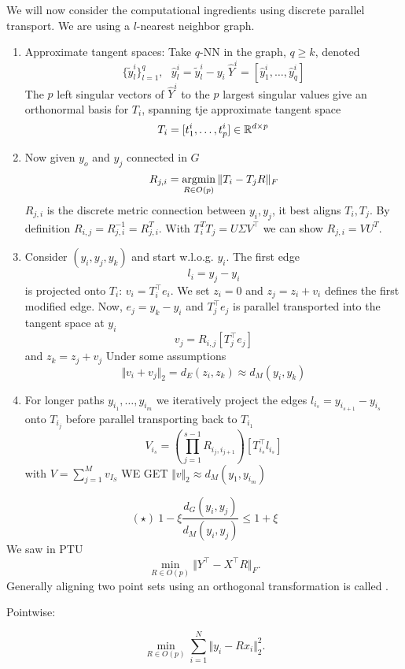 We will now consider the computational ingredients using discrete parallel transport.
We are using a $l$-nearest neighbor graph.
\begin{enumerate}
    \item Approximate tangent spaces: Take $q$-NN in the graph, $q\geq k$, denoted \[\{\tilde{y}_{l}^i\}_{l=1}^q,\text{ }\hat{y}_l^i = \tilde{y}_l^i-y_i\ \hat{Y}^i=[\hat{y}_1^i,\dots,\hat{y}_q^i]\]The $p$ left singular vectors of $\hat{Y}^i$ to the $p$ largest singular values give an orthonormal basis for $T_i$, spanning tje approximate tangent space\[T_i=[t_1^i,\dots,t_p^i]\in\mathbb{R}^{d\times p}\]
    \item Now given $y_o$ %
    and $y_j$ connected in $G$ \[R_{j,i}=\operatorname*{\text{argmin}}_{R\in O(p)}\Vert T_i-T_jR\Vert_F \]
    $R_{j,i}$ is the discrete metric connection between $y_i,y_j$, it best aligns $T_i,T_j$. By definition $R_{i,j}=R_{j,i}^{-1}=R_{j,i}^T$. With $T_i^TT_j=U\Sigma V^\intercal$ we can show $R_{j,i}=VU^T$.
    \item  Consider $(y_i,y_j,y_k)$ and start w.l.o.g. $y_i$. The first edge \[l_i=y_j-y_i\]
    is projected onto $T_i$: $v_i=T_i^\intercal e_i$.
    We set $z_i=0$ and $z_j=z_i+v_i$ defines the first modified edge. Now, $e_j=y_k-y_i$ and $T_j^\intercal e_j$ is parallel transported 
    into the tangent space at $y_i$\[v_j=R_{i,j}[T_j^\intercal e_j]\] and $z_k=z_j+v_j$%
    Under some assumptions 
    \[\Vert v_i+v_j\Vert_2=d_E(z_i,z_k)\approx d_M(y_i,y_k)\]
    \item For longer paths $y_{i_1},\dots,y_{i_m}$ we iteratively project the edges $l_{i_s}=y_{i_{s+1}}-y_{i_s}$ onto $T_{i_j}$ before parallel transporting back to $T_{i_1}$\[V_{i_s}=\left(\prod_{j=1}^{s-1} R_{i_j,i_{j+1}}\right)[T_{i_s}^\intercal l_{i_s}]\]
    with $V=\sum_{j=1}^M v_{I_S}$ WE GET $\Vert v \Vert_2\approx d_M(y_1,y_{i_m})$
\end{enumerate}
\[(\star)\ 1-\xi \frac{d_G(y_i,y_j)}{d_M(y_i,y_j)}\leq 1+\xi\]
We saw in PTU 
\[\min_{R\in O(p)}\Vert Y^\intercal - X^\intercal R\Vert_F.\]
Generally aligning two point sets using an orthogonal transformation is called .

Pointwise:

\[\min_{R\in O(p)}\sum_{i=1}^N\Vert y_i - Rx_i\Vert_2^2.\]

